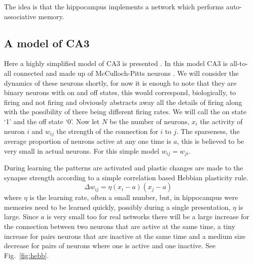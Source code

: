 \documentclass[11pt,a4paper]{scrartcl}
\begin{document}
The idea is that the hippocampus implements a network which performs
auto-associative memory.

\subsection*{A model of CA3}
Here a highly simplified model of CA3 is presented
\cite{Amit1992a}. In this model CA3 is all-to-all connected and made
up of McCulloch-Pitts neurons \cite{McCullochPitts1943a}. We will
consider the dynamics of these neurons shortly, for now it is enough
to note that they are binary neurons with on and off states, this
would correspond, biologically, to firing and not firing and obviously
abstracts away all the details of firing along with the possibility of
there being different firing rates. We will call the on state
\lq{}1\rq{} and the off state \lq{}0\rq{}. Now let $N$ be the number
of neurons, $x_i$ the activity of neuron $i$ and $w_{ij}$ the strength
of the connection for $i$ to $j$. The sparseness, the average
proportion of neurons active at any one time is $a$, this is believed
to be very small in actual neurons. For this simple model $w_{ij}=w_{ji}$.

During learning the patterns are activated and plastic changes are
made to the synapse strength according to a simple correlation based Hebbian plasticity rule.
\begin{equation}
\Delta w_{ij}=\eta (x_i-a)(x_j-a)
\end{equation}
where $\eta$ is the learning rate, often a small number, but, in
hippocampus were memories need to be learned quickly, possibly during
a single presentation, $\eta$ is large. Since $a$ is very small too
for real networks there will be a large increase for the connection
between two neurons that are active at the same time, a tiny increase
for pairs neurons that are inactive at the same time and a medium size
decrease for pairs of neurons where one is active and one
inactive. See Fig.~\ref{fig:hebb}.
\end{document}
